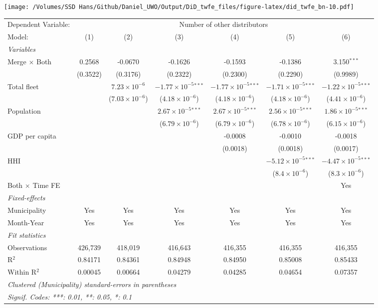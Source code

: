 \documentclass[
]{article}
\begin{document}
\texttt{[image: /Volumes/SSD Hans/Github/Daniel\_UWO/Output/DiD\_twfe\_files/figure-latex/did\_twfe\_bn-10.pdf]}

\begin{tabular}{lcccccc}
\tabularnewline\midrule\midrule
Dependent Variable:&\multicolumn{6}{c}{Number of other distributors}\\
Model:&(1) & (2) & (3) & (4) & (5) & (6)\\
\midrule \emph{Variables}&   &   &   &   &   &  \\
Merge $\times $ Both & 0.2568 & -0.0670 & -0.1626 & -0.1593 & -0.1386 & 3.150$^{***}$\\
  &(0.3522) & (0.3176) & (0.2322) & (0.2300) & (0.2290) & (0.9989)\\
Total fleet &    & $7.23\times 10^{-6}$ & $-1.77\times 10^{-5}$$^{***}$ & $-1.77\times 10^{-5}$$^{***}$ & $-1.71\times 10^{-5}$$^{***}$ & $-1.22\times 10^{-5}$$^{***}$\\
  &   & ($7.03\times 10^{-6}$) & ($4.18\times 10^{-6}$) & ($4.18\times 10^{-6}$) & ($4.18\times 10^{-6}$) & ($4.41\times 10^{-6}$)\\
Population &    &    & $2.67\times 10^{-5}$$^{***}$ & $2.67\times 10^{-5}$$^{***}$ & $2.56\times 10^{-5}$$^{***}$ & $1.86\times 10^{-5}$$^{***}$\\
  &   &    & ($6.79\times 10^{-6}$) & ($6.79\times 10^{-6}$) & ($6.78\times 10^{-6}$) & ($6.15\times 10^{-6}$)\\
GDP per capita &    &    &    & -0.0008 & -0.0010 & -0.0018\\
  &   &    &    & (0.0018) & (0.0018) & (0.0017)\\
HHI &    &    &    &    & $-5.12\times 10^{-5}$$^{***}$ & $-4.47\times 10^{-5}$$^{***}$\\
  &   &    &    &    & ($8.4\times 10^{-6}$) & ($8.3\times 10^{-6}$)\\
Both $\times$ Time FE &  &  &  &  &  & Yes\\
\midrule \emph{Fixed-effects}&   &   &   &   &   &  \\
Municipality & Yes & Yes & Yes & Yes & Yes & Yes\\
Month-Year & Yes & Yes & Yes & Yes & Yes & Yes\\
\midrule \emph{Fit statistics}&  & & & & & \\
Observations & 426,739&418,019&416,643&416,355&416,355&416,355\\
R$^2$ & 0.84171&0.84361&0.84948&0.84950&0.85008&0.85433\\
Within R$^2$ & 0.00045&0.00664&0.04279&0.04285&0.04654&0.07357\\
\midrule\midrule\multicolumn{7}{l}{\emph{Clustered (Municipality) standard-errors in parentheses}}\\
\multicolumn{7}{l}{\emph{Signif. Codes: ***: 0.01, **: 0.05, *: 0.1}}\\
\end{tabular}
\end{document}
